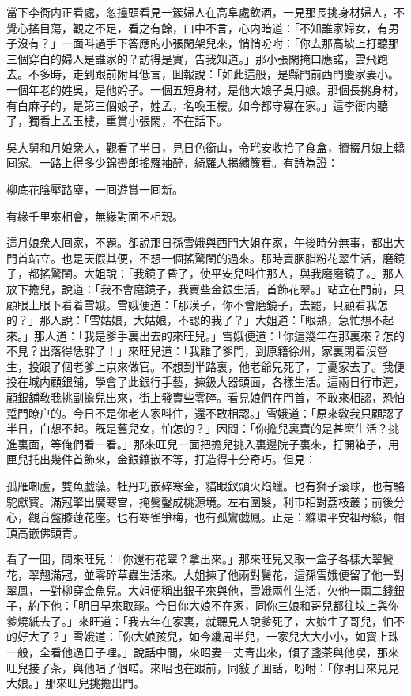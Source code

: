 當下李衙内正看處，忽擡頭看見一簇婦人在高阜處飲酒，一見那長挑身材婦人，不覺心搖目蕩，觀之不足，看之有餘，口中不言，心内暗道：「不知誰家婦女，有男子沒有？」一面呌過手下答應的小張閑架兒來，悄悄吩咐：「你去那高坡上打聽那三個穿白的婦人是誰家的？訪得是實，告我知道。」那小張閑掩口應諾，雲飛跑去。不多時，走到跟前附耳低言，囬報說：「如此這般，是縣門前西門慶家妻小。一個年老的姓吳，是他妗子。一個五短身材，是他大娘子吳月娘。那個長挑身材，有白麻子的，是第三個娘子，姓孟，名喚玉樓。如今都守寡在家。」這李衙内聽了，獨看上孟玉樓，重賞小張閑，不在話下。

吳大舅和月娘衆人，觀看了半日，見日色銜山，令玳安收拾了食盒，攛掇月娘上轎囘家。一路上得多少錦轡郎搖羅袖醉，綺羅人揭繡簾看。有詩為證：

\begin{myquote}
柳底花陰壓路塵，一囘遊賞一囘新。

有緣千里來相會，無緣對面不相親。
\end{myquote}

這月娘衆人囘家，不題。卻說那日孫雪娥與西門大姐在家，午後時分無事，都出大門首站立。也是天假其便，不想一個搖驚閨的過來。那時賣胭脂粉花翠生活，磨鏡子，都搖驚閨。大姐說：「我鏡子昏了，使平安兒呌住那人，與我磨磨鏡子。」那人放下擔兒，說道：「我不會磨鏡子，我賣些金銀生活，首飾花翠。」站立在門前，只顧眼上眼下看着雪娥。雪娥便道：「那漢子，你不會磨鏡子，去罷，只顧看我怎的？」那人說：「雪姑娘，大姑娘，不認的我了？」大姐道：「眼熟，急忙想不起來。」那人道：「我是爹手裏出去的來旺兒。」雪娥便道：「你這幾年在那裏來？怎的不見？出落得恁胖了！」來旺兒道：「我離了爹門，到原籍徐州，家裏閑着沒營生，投跟了個老爹上京來做官。不想到半路裏，他老爺兒死了，丁憂家去了。我便投在城内顧銀舖，學會了此銀行手藝，揀鈒大器頭面，各樣生活。這兩日行市遲，顧銀舖敎我挑副擔兒出來，街上發賣些零碎。看見娘們在門首，不敢來相認，恐怕踅門瞭户的。今日不是你老人家呌住，還不敢相認。」雪娥道：「原來敎我只顧認了半日，白想不起。旣是舊兒女，怕怎的？」因問：「你擔兒裏賣的是甚麽生活？挑進裏面，等俺們看一看。」那來旺兒一面把擔兒挑入裏邊院子裏來，打開箱子，用匣兒托出幾件首飾來，金銀鑲嵌不等，打造得十分奇巧。但見：

\begin{myquote}
孤雁啣蘆，雙魚戯藻。牡丹巧嵌碎寒金，貓眼釵頭火焰蠟。也有獅子滚球，也有駱駝獻寳。滿冠擎出廣寒宫，掩鬢鑿成桃源境。左右圍髮，利市相對荔枝叢；前後分心，觀音盤膝蓮花座。也有寒雀爭梅，也有孤鸞戯鳳。正是：縧環平安祖母綠，帽頂高嵌佛頭青。
\end{myquote}

看了一囬，問來旺兒：「你還有花翠？拿出來。」那來旺兒又取一盒子各樣大翠鬢花，翠翹滿冠，並零碎草蟲生活來。大姐揀了他兩對鬢花，這孫雪娥便留了他一對翠鳳，一對柳穿金魚兒。大姐便稱出銀子來與他，雪娥兩件生活，欠他一兩二錢銀子，約下他：「明日早來取罷。今日你大娘不在家，同你三娘和哥兒都往坟上與你爹燒紙去了。」來旺道：「我去年在家裏，就聽見人說爹死了，大娘生了哥兒，怕不的好大了？」雪娥道：「你大娘孩兒，如今纔周半兒，一家兒大大小小，如寳上珠一般，全看他過日子哩。」說話中間，來昭妻一丈青出來，傾了盞茶與他喫，那來旺兒接了茶，與他唱了個喏。來昭也在跟前，同敍了囬話，吩咐：「你明日來見見大娘。」那來旺兒挑擔出門。

